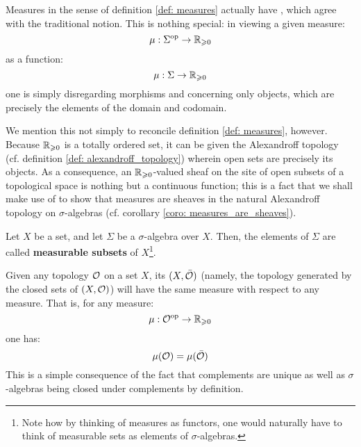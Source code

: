         \begin{remark} \label{remark: measures_are_functions}
            Measures in the sense of definition \ref{def: measures} actually have , which agree with the traditional notion. This is nothing special: in viewing a given measure:
                $$\mu: \Sigma^{\mathrm{op}} \to \mathbb{R}_{\geqslant 0}$$
            as a function:
                $$\mu: \Sigma \to \mathbb{R}_{\geqslant 0}$$
            one is simply disregarding morphisms and concerning only objects, which are precisely the elements of the domain and codomain.
            
            We mention this not simply to reconcile definition \ref{def: measures}, however. Because $\mathbb{R}_{\geqslant 0}$ is a totally ordered set, it can be given the Alexandroff topology (cf. definition \ref{def: alexandroff_topology}) wherein open sets are precisely its objects. As a consequence, an $\mathbb{R}_{\geqslant 0}$-valued sheaf on the site of open subsets of a topological space is nothing but a continuous function; this is a fact that we shall make use of to show that measures are sheaves in the natural Alexandroff topology on $\sigma$-algebras (cf. corollary \ref{coro: measures_are_sheaves}).
        \end{remark}
        
        \begin{definition}
            Let $X$ be a set, and let $\Sigma$ be a $\sigma$-algebra over $X$. Then, the elements of $\Sigma$ are called \textbf{measurable subsets} of $X$\footnote{Note how by thinking of measures as functors, one would naturally have to think of measurable sets as elements of $\sigma$-algebras.}. 
        \end{definition}
        \begin{example}
            Given any topology $\mathcal{O}$ on a set $X$, its  $(X, \bar{\mathcal{O}})$ (namely, the topology generated by the closed sets of $(X, \mathcal{O})$) will have the same measure with respect to any measure. That is, for any measure:
                $$\mu: \mathcal{O}^{\mathrm{op}} \to \mathbb{R}_{\geqslant 0}$$
            one has:
                $$\mu(\mathcal{O}) = \mu(\bar{\mathcal{O}})$$
            This is a simple consequence of the fact that complements are unique as well as $\sigma$-algebras being closed under complements by definition.
        \end{example}
        
